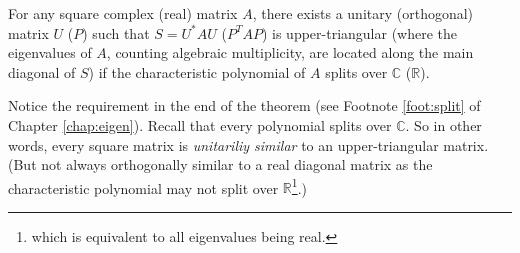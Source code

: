 \begin{thm}
\label{thm:schurtrig}
For any square complex (real) matrix $A$, there exists a unitary (orthogonal) matrix $U$ ($P$) such that $S = U^*AU$ ($P^TAP$) is upper-triangular (where the eigenvalues of $A$, counting algebraic multiplicity, are located along the main diagonal of $S$) if the characteristic polynomial of $A$ splits over $\mathbb{C}$ ($\mathbb{R}$).
\end{thm}
Notice the requirement in the end of the theorem (see Footnote \ref{foot:split} of Chapter \ref{chap:eigen}). Recall that every polynomial splits over $\mathbb{C}$. So in other words, every square matrix is \textit{unitariliy similar} to an upper-triangular matrix. (But not always orthogonally similar to a real diagonal matrix as the characteristic polynomial may not split over $\mathbb{R}$\footnote{which is equivalent to all eigenvalues being real.}.)
